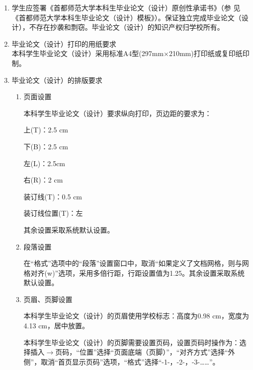 \begin{itemize}[font=\cusong]
\begin{enumerate}
\item 学生应签署《首都师范大学本科生毕业论文（设计）原创性承诺书》（参
见《首都师范大学本科生毕业论文（设计）模板》）。保证独立完成毕业论文（设
计），不存在抄袭和剽窃。毕业论文（设计）的知识产权归学校所有。
\item 毕业论文（设计）打印的用纸要求\\
本科学生毕业论文（设计）采用标准A4型(297mm×210mm)打印纸或复印纸印制。
\item 毕业论文（设计）的排版要求
	\begin{enumerate}[label=(\arabic* )]%
	\item 页面设置\par
\CTEXindent 
本科学生毕业论文（设计）要求纵向打印，页边距的要求为：\par

上(T)：2.5 cm\par

下(B)：2.5 cm\par

左(L)：2.5cm\par

右(R)：2 cm\par

装订线(T)：0.5 cm\par

装订线位置(T)：左\par

其余设置采取系统默认设置。
\item 段落设置\par
在“格式”选项中的“段落”设置窗口中，取消“如果定义了文档网格，则与网格对齐(w)”选项，采用多倍行距，行距设置值为1.25。其余设置采取系统默认设置。
\item 页眉、页脚设置\par
本科学生毕业论文（设计）的页眉使用学校标志：高度为0.98 cm，宽度为4.13 cm，居中放置。\par
本科学生毕业论文（设计）的页脚需要设置页码，设置页码时操作为：选择插入$\rightarrow$页码，“位置”选择“页面底端（页脚）”，“对齐方式”选择“外侧”，取消“首页显示页码”选项，“格式”选择“-1-，-2-，-3-……”。
	\end{enumerate}
\end{enumerate}


\end{itemize}
